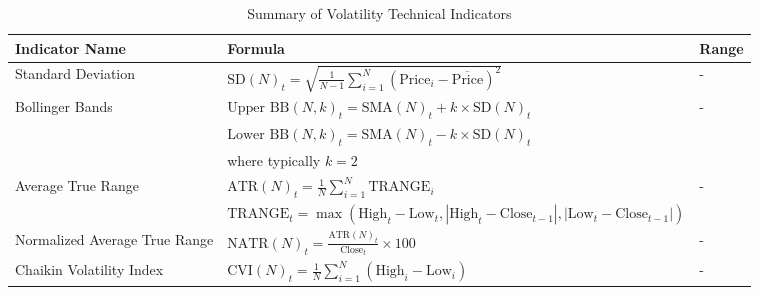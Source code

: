\begin{table}[htb!]
\caption{Summary of Volatility Technical Indicators}
\label{Table:VolatilityIndicators}
\centering
\footnotesize
\begin{tabularx}{\textwidth}{@{}lXl@{}}
\toprule
\textbf{Indicator Name} & \textbf{Formula} & \textbf{Range} \\ 
\midrule
Standard Deviation & $\text{SD}(N)_t = \sqrt{\frac{1}{N-1} \sum_{i=1}^{N} (\text{Price}_i - \overline{\text{Price}})^2}$ & - \\
\addlinespace
Bollinger Bands & $\text{Upper BB}(N, k)_t = \text{SMA}(N)_t + k \times \text{SD}(N)_t$ & - \\
\addlinespace
& $\text{Lower BB}(N, k)_t = \text{SMA}(N)_t - k \times \text{SD}(N)_t$ & \\
\addlinespace
& where typically $ k = 2 $& \\
\addlinespace
Average True Range & $\text{ATR}(N)_t = \frac{1}{N} \sum_{i=1}^{N} \text{TRANGE}_i$ & - \\
\addlinespace
& $\text{TRANGE}_t = \max(\text{High}_t - \text{Low}_t, |\text{High}_t - \text{Close}_{t-1}|, |\text{Low}_t - \text{Close}_{t-1}|)$ & \\
\addlinespace
Normalized Average True Range & $\text{NATR}(N)_t = \frac{\text{ATR}(N)_t}{\text{Close}_t} \times 100$ & - \\
\addlinespace
Chaikin Volatility Index & $\text{CVI}(N)_t = \frac{1}{N} \sum_{i=1}^{N} (\text{High}_i - \text{Low}_i)$ & - \\
\bottomrule
\end{tabularx}
\end{table}
